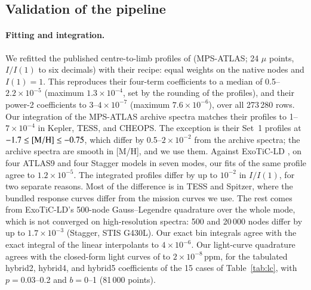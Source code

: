 \documentclass{aa}
\newcommand{\ppm}{\,\textrm{ppm}}
\begin{document}
\begin{appendix}
\section{Validation of the pipeline}\label{app:validation}
\paragraph{Fitting and integration.} We refitted the published
centre-to-limb profiles of \citet{kostogryz2022} (MPS-ATLAS; 24 $\mu$ points,
$I/I(1)$ to six decimals) with their recipe: equal weights on the native
nodes and $I(1)=1$. This reproduces their four-term coefficients to a median
of 0.5--$2.2\times10^{-5}$ (maximum $1.3\times10^{-4}$, set by the rounding of
the profiles), and their power-2 coefficients to 3--$4\times10^{-7}$
(maximum $7.6\times10^{-6}$), over all 273\,280 rows. Our integration of the
MPS-ATLAS archive spectra matches their profiles to 1--$7\times10^{-4}$ in
Kepler, TESS, and CHEOPS. The exception is their Set~1 profiles at
$-1.7\le[{\rm M/H}]\le-0.75$, which differ by 0.5--$2\times10^{-2}$ from the
archive spectra; the archive spectra are smooth in [M/H], and we use them.
Against ExoTiC-LD \citep{grant2024}, on four ATLAS9 and four Stagger models in
seven modes, our fits of the same profile agree to $1.2\times10^{-5}$. The
integrated profiles differ by up to $10^{-2}$ in $I/I(1)$, for two separate
reasons. Most of the difference is in TESS and Spitzer, where the bundled
response curves differ from the mission curves we use. The rest comes from
ExoTiC-LD's 500-node Gauss--Legendre quadrature over the whole mode, which is
not converged on high-resolution spectra: 500 and 20\,000 nodes differ by up
to $1.7\times10^{-3}$ (Stagger, STIS G430L). Our exact bin integrals agree
with the exact integral of the linear interpolants to $4\times10^{-6}$. Our
light-curve quadrature agrees with the closed-form light curves of
\citet{squishier} to $2\times10^{-8}\ppm$, for the tabulated hybrid2, hybrid4,
and hybrid5 coefficients of the 15 cases of Table~\ref{tab:lc}, with
$p=0.03$--0.2 and $b=0$--1 (81\,000 points).


\end{appendix}
\end{document}
